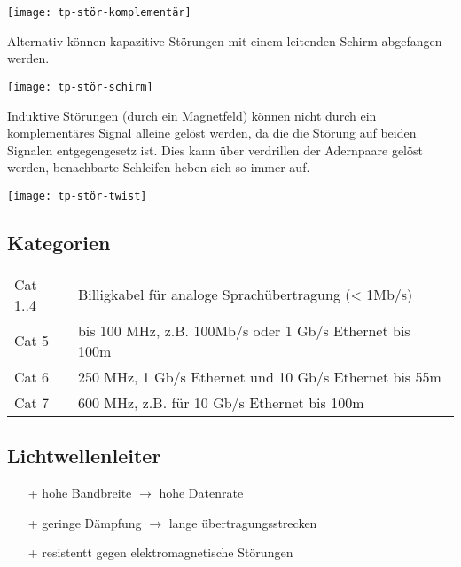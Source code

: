 \begin{center}
    \texttt{[image: tp-stör-komplementär]}
\end{center}

Alternativ können kapazitive Störungen mit einem leitenden Schirm abgefangen werden.

\begin{center}
    \texttt{[image: tp-stör-schirm]}
\end{center}

Induktive Störungen (durch ein Magnetfeld) können nicht durch ein komplementäres Signal alleine gelöst werden, da
die die Störung auf beiden Signalen entgegengesetz ist.
Dies kann über verdrillen der Adernpaare gelöst werden, benachbarte Schleifen heben sich
so immer auf.

\begin{center}
    \texttt{[image: tp-stör-twist]}
\end{center}


\subsection{Kategorien}

\begin{center}
    \begin{tabular}{@{$\bullet \,$}ll}
        Cat 1..4 & Billigkabel für analoge Sprachübertragung (< 1Mb/s)     \\
        Cat 5    & bis 100 MHz, z.B. 100Mb/s oder 1 Gb/s Ethernet bis 100m \\
        Cat 6    & 250 MHz, 1 Gb/s Ethernet und 10 Gb/s Ethernet bis 55m   \\
        Cat 7    & 600 MHz, z.B. für 10 Gb/s Ethernet bis 100m             \\
    \end{tabular}
\end{center}


\subsection{Lichtwellenleiter}

\begin{itemize}
    \item[+] hohe Bandbreite $\rightarrow$ hohe Datenrate
    \item[+] geringe Dämpfung $\rightarrow$ lange übertragungsstrecken
    \item[+] resistentt gegen elektromagnetische Störungen
\end{itemize}

